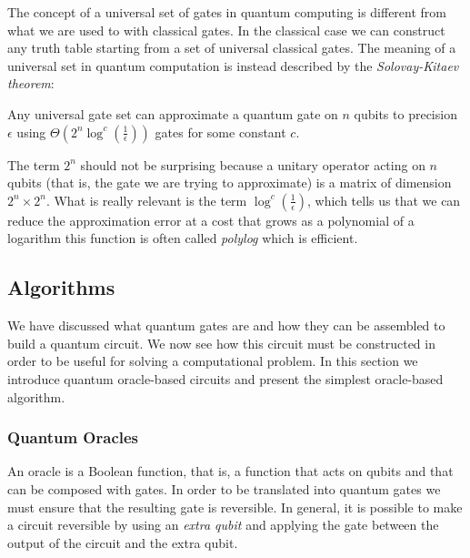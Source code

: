 The concept of a universal set of gates in quantum computing is different from what we are used to with classical gates. In the classical case we can construct any truth table starting from a set of universal classical gates. The meaning of a universal set in quantum computation is instead described by the \emph{Solovay-Kitaev theorem}:
\begin{theorem}
	Any universal gate set can approximate a quantum gate on $n$ qubits to precision $\epsilon$ using $\Theta(2^n\log^c(\frac{1}{\epsilon}))$ gates for some constant $c$.
\end{theorem} 

The term $2^n$ should not be surprising because a unitary operator acting on $n$ qubits (that is, the gate we are trying to approximate) is a matrix of dimension $2^n \times 2^n$. What is really relevant is the term $\log^c(\frac{1}{\epsilon})$, which tells us that we can reduce the approximation error at a cost that grows as a polynomial of a logarithm \textemdash{}this function is often called \emph{polylog}\textemdash{} which is efficient.

\subsection{Algorithms}
\label{sec:qa_algo}
We have discussed what quantum gates are and how they can be assembled to build a quantum circuit. We now see how this circuit must be constructed in order to be useful for solving a computational problem. In this section we introduce quantum oracle-based circuits and present the simplest oracle-based algorithm.

\subsubsection*{Quantum Oracles}
An oracle is a Boolean function, that is, a function that acts on qubits and that can be composed with gates. In order to be translated into quantum gates we must ensure that the resulting gate is reversible. In general, it is possible to make a circuit reversible by using an \emph{extra qubit} and applying the  gate between the output of the circuit and the extra qubit. 

